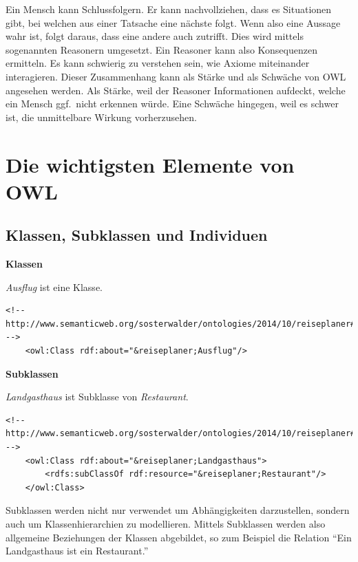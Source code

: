 Ein Mensch kann Schlussfolgern. Er kann nachvollziehen, dass es Situationen gibt, bei welchen aus einer Tatsache eine nächste folgt. Wenn also eine Aussage wahr ist, folgt daraus, dass eine andere auch zutrifft. Dies wird mittels sogenannten Reasonern umgesetzt. Ein Reasoner kann also Konsequenzen ermitteln. Es kann schwierig zu verstehen sein, wie Axiome miteinander interagieren. Dieser Zusammenhang kann als Stärke und als Schwäche von OWL angesehen werden. Als Stärke, weil der Reasoner Informationen aufdeckt, welche ein Mensch ggf.\ nicht erkennen würde. Eine Schwäche hingegen, weil es schwer ist, die unmittelbare Wirkung vorherzusehen.

\section{Die wichtigsten Elemente von OWL}
\label{sec:owlRdf_owl_wichtigsteElemente}

\subsection{Klassen, Subklassen und Individuen}
\label{sec:owlRdf_owl_wissenModellieren_wichtigsteElemente_Classen}

\textbf{Klassen}

\textit{Ausflug} ist eine Klasse.

\begin{lstlisting}[caption={Beispiel einer Klasse}]
    <!-- http://www.semanticweb.org/sosterwalder/ontologies/2014/10/reiseplaner#Ausflug -->
    <owl:Class rdf:about="&reiseplaner;Ausflug"/>
\end{lstlisting}

\textbf{Subklassen}

\textit{Landgasthaus} ist Subklasse von \textit{Restaurant}.

\begin{lstlisting}[caption={Beispiel einer Subklasse}]
    <!-- http://www.semanticweb.org/sosterwalder/ontologies/2014/10/reiseplaner#Landgasthaus -->
    <owl:Class rdf:about="&reiseplaner;Landgasthaus">
        <rdfs:subClassOf rdf:resource="&reiseplaner;Restaurant"/>
    </owl:Class>
\end{lstlisting}
Subklassen werden nicht nur verwendet um Abhängigkeiten darzustellen, sondern auch um Klassenhierarchien zu modellieren. Mittels Subklassen werden also allgemeine Beziehungen der Klassen abgebildet, so zum Beispiel die Relation ``Ein Landgasthaus ist ein Restaurant.''

